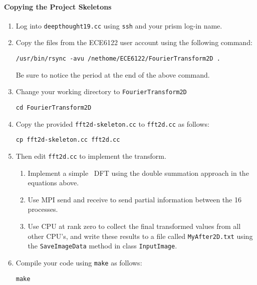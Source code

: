 \documentclass[10pt]{article}
\begin{document}
\paragraph{Copying the Project Skeletons}
\begin{enumerate}
\item Log into {\tt deepthought19.cc} using {\tt ssh} and your prism log-in name.
\item Copy the files from the ECE6122 user account using the following
command:
\begin{verbatim}
/usr/bin/rsync -avu /nethome/ECE6122/FourierTransform2D .
\end{verbatim}
Be sure to notice the period at the end of the above command.
\item Change your working directory to {\tt FourierTransform2D}
\begin{verbatim}
cd FourierTransform2D
\end{verbatim}
\item Copy the provided {\tt fft2d-skeleton.cc} to {\tt fft2d.cc} as follows:
\begin{verbatim}
cp fft2d-skeleton.cc fft2d.cc
\end{verbatim}
\item Then edit {\tt fft2d.cc} to implement the transform.
\begin{enumerate}
\item Implement a simple \od\ DFT using the double summation approach
in the equations above.
\item Use MPI send and receive to send partial
information between the 16 processes.
\item Use CPU at rank zero to collect the final transformed values
from all other CPU's, and write these results to a file called
{\tt MyAfter2D.txt} using the {\tt SaveImageData} method in
class {\tt InputImage}.
\end{enumerate}
\item Compile your code using {\tt make} as follows:
\begin{verbatim}
make
\end{verbatim}
\end{enumerate}
\end{document}
